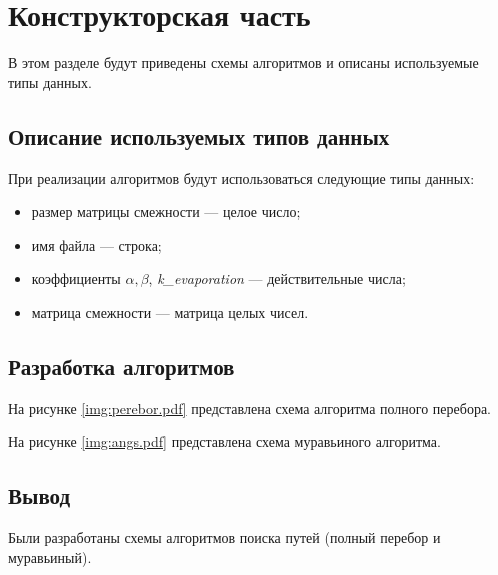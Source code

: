 \chapter{Конструкторская часть}
В этом разделе будут приведены схемы алгоритмов и описаны используемые типы данных.

\section{Описание используемых типов данных}

При реализации алгоритмов будут использоваться следующие типы данных:
\begin{itemize}[label=--]
	\item размер матрицы смежности --- целое число;
	\item имя файла --- строка;
	\item коэффициенты $\alpha, \beta$, \textit{k\_evaporation} --- действительные числа;
	\item матрица смежности --- матрица целых чисел.
\end{itemize}

\section{Разработка алгоритмов}

На рисунке \ref{img:perebor.pdf} представлена схема алгоритма полного перебора.


\FloatBarrier

На рисунке \ref{img:angs.pdf} представлена схема муравьиного алгоритма.


\FloatBarrier

\section*{Вывод}

Были разработаны схемы алгоритмов поиска путей (полный перебор и муравьиный).


